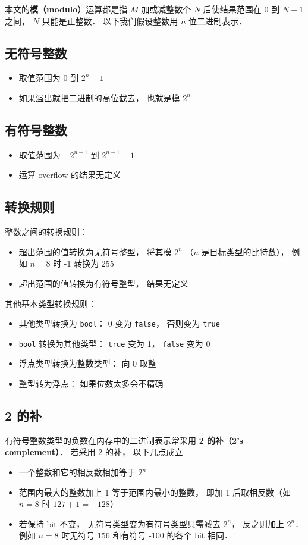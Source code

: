 
本文的\textbf{模（modulo）}运算都是指 $M$ 加或减整数个 $N$ 后使结果范围在 $0$ 到 $N-1$ 之间， $N$ 只能是正整数． 以下我们假设整数用 $n$ 位二进制表示．

\subsection{无符号整数}
\begin{itemize}
\item 取值范围为 $0$ 到 $2^n-1$
\item 如果溢出就把二进制的高位截去， 也就是模 $2^n$
\end{itemize}

\subsection{有符号整数}
\begin{itemize}
\item 取值范围为 $-2^{n-1}$ 到 $2^{n-1}-1$
\item 运算 overflow 的结果无定义
\end{itemize}

\subsection{转换规则}
整数之间的转换规则：
\begin{itemize}
\item 超出范围的值转换为无符号整型， 将其模 $2^n$ （$n$ 是目标类型的比特数）， 例如 $n = 8$ 时 -1 转换为 255
\item 超出范围的值转换为有符号整型， 结果无定义
\end{itemize}
其他基本类型转换规则：
\begin{itemize}
\item 其他类型转换为 \verb|bool|： 0 变为 \verb|false|， 否则变为 \verb|true|
\item \verb|bool| 转换为其他类型： \verb|true| 变为 1， \verb|false| 变为 0
\item 浮点类型转换为整数类型： 向 0 取整
\item 整型转为浮点： 如果位数太多会不精确
\end{itemize}

\subsection{2 的补}
有符号整数类型的负数在内存中的二进制表示常采用 \textbf{2 的补（2's complement）}． 若采用 2 的补， 以下几点成立
\begin{itemize}
\item 一个整数和它的相反数相加等于 $2^n$
\item 范围内最大的整数加上 1 等于范围内最小的整数， 即加 1 后取相反数（如 $n = 8$ 时 $127 + 1 = -128$）
\item 若保持 bit 不变， 无符号类型变为有符号类型只需减去 $2^n$， 反之则加上 $2^n$． 例如 $n = 8$ 时无符号 156 和有符号 -100 的各个 bit 相同．
\end{itemize}

